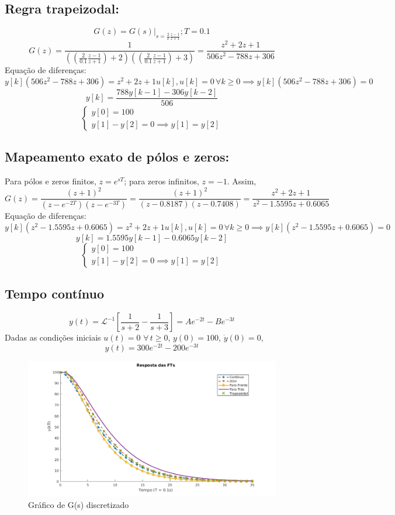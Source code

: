 \documentclass{article}
\begin{document}
\subsection{Regra trapeizodal:}
    \[ G(z) = \left.G(s)\right|_{s=\frac 2 T\frac{z-1}{z+1}}; T = 0.1 \]
    \[ G(z) = \frac{1}{\left( \left( \frac{2}{0.1}\frac{z-1}{z+1} \right) +2 \right)\left(\left( \frac{2}{0.1}\frac{z-1}{z+1}\right) +3 \right)} = \frac{z^2 + 2z +1}{506z^2 - 788z + 306} \]
    {Equação de diferenças:}
    \[ y[k](506z^2 - 788z + 306) = z^2 + 2z + 1 u[k], u[k] = 0 \,\forall k \geq 0 \implies y[k](506z^2 - 788z + 306) = 0 \]
    \[ y[k] = \frac{788 y[k-1] - 306 y[k-2]}{506} \]
    \[ \begin{cases}
        y[0] = 100\\
        y[1] - y[2] = 0 \implies y[1] = y[2]
    \end{cases}\]


\subsection{Mapeamento exato de pólos e zeros:}
    {Para pólos e zeros finitos, $z = e^{sT}$; para zeros infinitos, $z = -1$. Assim,}
    \[ G(z) = \frac{(z+1)^2}{(z-e^{-2T})(z-e^{-3T})} = \frac{(z+1)^2}{(z - 0.8187)(z - 0.7408)} = \frac{z^2 + 2z +1}{z^2 - 1.5595z + 0.6065} \]
    {Equação de diferenças:}
    \[ y[k](z^2 - 1.5595z + 0.6065) = z^2 + 2z +1 u[k], u[k] = 0 \,\forall k \geq 0 \implies y[k](z^2 - 1.5595z + 0.6065) = 0 \]
    \[ y[k] = 1.5595 y[k-1] - 0.6065 y[k-2] \]
    \[ \begin{cases}
        y[0] = 100\\
        y[1] - y[2] = 0 \implies y[1] = y[2]
    \end{cases}\]


\subsection*{Tempo contínuo}
    \[ y(t) = \mathcal{L}^{-1}\left[ \frac{1}{s+2} - \frac{1}{s+3} \right] = Ae^{-2t} - Be^{-3t} \]
    {Dadas as condições iniciais $u(t) = 0$ $\forall\, t \geq 0$, $y(0) = 100$, $\dot{y}(0) = 0$,}
    \[ y(t) = 300e^{-2t} - 200e^{-3t} \]


    \begin{figure}[H]
        \centering
            \includegraphics[width=1\linewidth]{images/discretizado.png}
            \caption{Gráfico de G(s) discretizado}\label{fig:discretizado}
    \end{figure}
\end{document}
